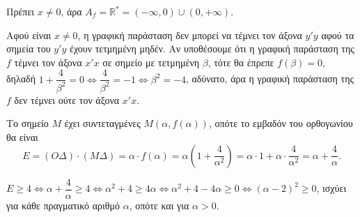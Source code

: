 
\begin{alist}
\item Πρέπει $x \ne 0$, άρα $A_f = \mathbb{R}^* = (-\infty, 0) \cup (0, +\infty)$.

\item Αφού είναι $x \ne 0$, η γραφική παράσταση δεν μπορεί να τέμνει τον άξονα $y'y$ αφού τα
σημεία του $y'y$ έχουν τετμημένη μηδέν.
Αν υποθέσουμε ότι η γραφική παράσταση της $f$ τέμνει τον άξονα $x'x$ σε σημείο με τετμημένη
$\beta$, τότε θα έπρεπε $f(\beta) = 0$, δηλαδή $1 + \dfrac{4}{\beta^2} = 0 \Leftrightarrow \dfrac{4}{\beta^2} = -1 \Leftrightarrow \beta^2 = -4$, αδύνατο, άρα η
γραφική παράσταση της $f$ δεν τέμνει ούτε τον άξονα $x'x$.

\item 
\begin{rlist}
\item Το σημείο $M$ έχει συντεταγμένες $M(\alpha, f(\alpha))$, οπότε το εμβαδόν του ορθογωνίου θα είναι
\[E = (O\Delta) \cdot (M\Delta) = \alpha \cdot f(\alpha) = \alpha \left(1 + \dfrac{4}{\alpha^2}\right) = \alpha \cdot 1 + \alpha \cdot \dfrac{4}{\alpha^2} = \alpha + \dfrac{4}{\alpha}.\]

\item $E \ge 4 \Leftrightarrow \alpha + \dfrac{4}{\alpha} \ge 4 \Leftrightarrow \alpha^2 + 4 \ge 4\alpha \Leftrightarrow \alpha^2 + 4 - 4\alpha \ge 0 \Leftrightarrow (\alpha - 2)^2 \ge 0$, ισχύει
για κάθε πραγματικό αριθμό $\alpha$, οπότε και για $\alpha > 0$.
\end{rlist}
\end{alist}

